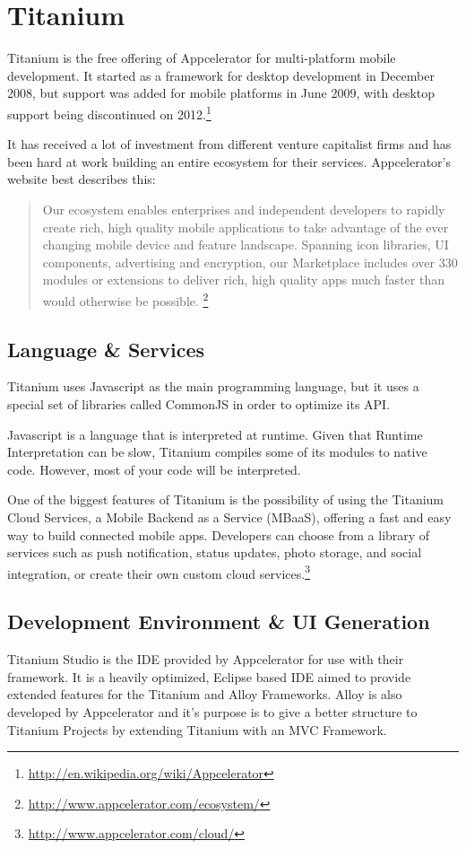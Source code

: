 \section{Titanium}
Titanium is the free offering of Appcelerator for multi-platform mobile development. It started as a framework for desktop development in December 2008, but support was added for mobile platforms in June 2009, with desktop support being discontinued on 2012.\footnote{\url{http://en.wikipedia.org/wiki/Appcelerator}}

It has received a lot of investment from different venture capitalist firms and has been hard at work building an entire ecosystem for their services. Appcelerator's website best describes this:
\begin{quotation}
Our ecosystem enables enterprises and independent developers to rapidly create rich, high quality mobile applications to take advantage of the ever changing mobile device and feature landscape.
Spanning icon libraries, UI components, advertising and encryption, our Marketplace includes over 330 modules or extensions to deliver rich, high quality apps much faster than would otherwise be possible.
\footnote{\url{http://www.appcelerator.com/ecosystem/}}
\end{quotation}
 

\subsection{Language \& Services}
Titanium uses Javascript as the main programming language, but it uses a special set of libraries called CommonJS in order to optimize its \ac{API}.

Javascript is a language that is interpreted at runtime. Given that Runtime Interpretation can be slow, Titanium compiles some of its modules to native code. However, most of your code will be interpreted.

One of the biggest features of Titanium is the possibility of using the Titanium Cloud Services, a Mobile Backend as a Service (MBaaS), offering a fast and easy way to build connected mobile apps. Developers can choose from a library of services such as push notification, status updates, photo storage, and social integration, or create their own custom cloud services.\footnote{\url{http://www.appcelerator.com/cloud/}} 



\subsection{Development Environment \& UI Generation}
Titanium Studio is the \ac{IDE} provided by Appcelerator for use with their framework. It is a heavily optimized, Eclipse based \ac{IDE} aimed to provide extended features for the Titanium and Alloy Frameworks. Alloy is also developed by Appcelerator and it's purpose is to give a better structure to Titanium Projects by extending Titanium with an \ac{MVC} Framework.

